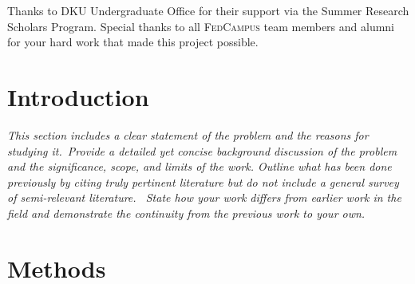 \documentclass[11pt,a4paper,oneside]{report}
\newcommand{\instructions}[1]{{\color{orange}\itshape #1}}
\newcommand{\fedcampus}{\textsc{FedCampus}\xspace}
\begin{document}
Thanks to DKU Undergraduate Office for their support via
the Summer Research Scholars Program.
Special thanks to all \fedcampus team members and alumni for your hard work that
made this project possible.

\newpage


\setcounter{tocdepth}{1}
\listoffigures\newpage


\setcounter{tocdepth}{1}
\listoftables\newpage


\clearpage
{}


\chapter{Introduction}
\label{introduction}

\instructions{This section includes a clear statement of the problem and the
    reasons for studying it.~Provide a detailed yet concise background
    discussion of the problem and the significance, scope, and limits of the
    work. Outline what has been done previously by citing truly pertinent
    literature but do not include a general survey of semi-relevant
    literature.~ State how your work differs from earlier work in the field
    and demonstrate the continuity from the previous work to your own.}




\chapter{Methods}
\label{methods}
\end{document}
